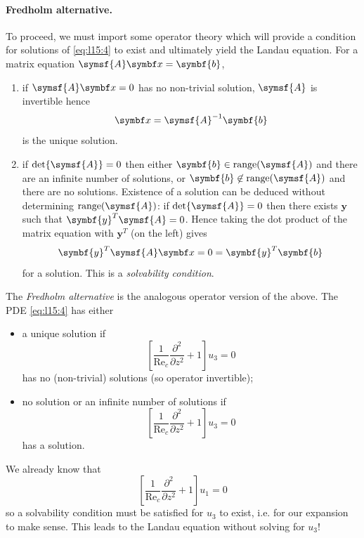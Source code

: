 \documentclass{jknotes}
\newcommand{\ReN}{\text{Re}}
\begin{document}
\paragraph{Fredholm alternative.} To proceed, we must import some operator
theory which will provide a condition for solutions of \eqref{eq:l15:4} to
exist and ultimately yield the Landau equation. For a matrix equation
$\symsf{A}\x = \symbf{b}$,
\begin{enumerate}
	\item if $\symsf{A}\x = 0$ has no non-trivial solution, $\symsf{A}$ is
		invertible hence
		\begin{equation}
			\x = \symsf{A}^{-1}\symbf{b}
		\end{equation}
		is the unique solution.
	\item if $\det \symsf{A} = 0$ then either $\symbf{b} \in
		\mathrm{range}(\symsf{A})$ and there are an infinite number of
		solutions, or $\symbf{b} \not\in \mathrm{range}(\symsf{A})$ and there
		are no solutions. Existence of a solution can be deduced without
		determining $\mathrm{range}(\symsf{A})$: if $\det \symsf{A} = 0$ then
		there exists $\symbf{y}$ such that $\symbf{y}^T \symsf{A} = 0$. Hence
		taking the dot product of the matrix equation with $\symbf{y}^T$ (on
		the left) gives
		\begin{equation}
			\symbf{y}^T\symsf{A}\x = 0 =  \symbf{y}^T \symbf{b}
		\end{equation}
		for a solution. This is a \emph{solvability condition}.
\end{enumerate}
The \emph{Fredholm alternative} is the analogous operator version of the
above. The PDE \eqref{eq:l15:4} has either
\begin{itemize}
	\item a unique solution if
		\begin{equation}
			\left[\frac{1}{\ReN_c}\frac{\partial^2}{\partial z^2} + 1\right]
			u_3 = 0
		\end{equation}
		has no (non-trivial) solutions (so operator invertible);
	\item no solution or an infinite number of solutions if
		\begin{equation}
			\left[\frac{1}{\ReN_c}\frac{\partial^2}{\partial z^2} + 1\right]
			u_3 = 0
		\end{equation}
		has a solution.
\end{itemize}
We already know that
\begin{equation}
	\left[\frac{1}{\ReN_c}\frac{\partial^2}{\partial z^2} + 1\right]
	u_1 = 0
\end{equation}
so a solvability condition must be satisfied for $u_3$ to exist, i.e. for our
expansion to make sense. This leads to the Landau equation without solving
for $u_3$! 
\end{document}
